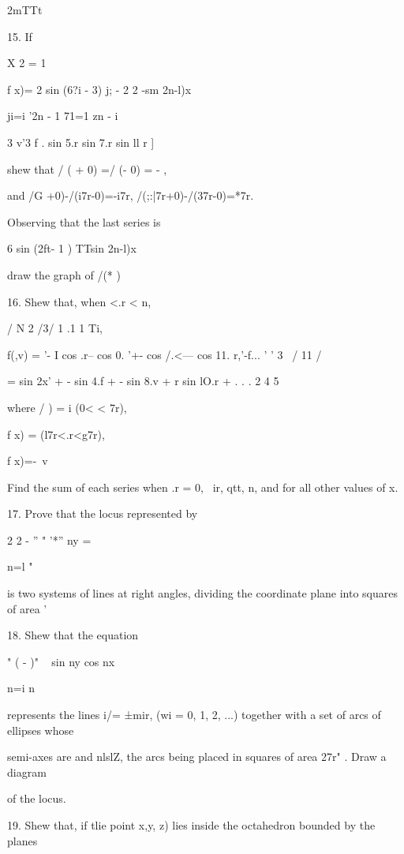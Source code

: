 2mTTt


%
%

15. If

X 2 = 1

f x)= 2 sin (6?i - 3) j; - 2 2 -sm 2n-l)x

ji=i '2n - 1 71=1 zn - i

3 v'3 f . sin 5.r sin 7.r sin ll r ]

shew that / ( + 0) =/ (\pi - 0) = - \pi,

and /G +0)-/(i7r-0)=-i7r, /(;:|7r+0)-/(37r-0)=*7r.

Observing that the last series is

6 sin (2ft- 1 ) TTsin 2n-l)x

draw the graph of /(* ) 

16. Shew that, when <.r < n,

 / N 2 /3/ 1 .1 1 Ti, \

f(,v) = '- I cos .r-- cos 0. '+- cos /.<--- cos 11. r,'-f... ' ' 3 \
/ 11 /

= sin 2x' + - sin 4.f + - sin 8.v + r sin lO.r + . . . 2 4 5

where / ) = i (0< < 7r),

f x) = (l7r<.r<g7r),

f x)=-\ v %

Find the sum of each series when .r = 0, \ ir, qtt, n, and for all
other values of x.


17. Prove that the locus represented by

2 2 - '' " '*'' ny =

n=l "

is two systems of lines at right angles, dividing the coordinate plane
into squares of area \pi'\ \addexamplecitation{Math. Trip. 1895.}

18. Shew that the equation

" ( - )" ~ sin ny cos nx \

n=i n ~

represents the lines i/= ±mir, (wi = 0, 1, 2, ...) together with a set
of arcs of ellipses whose

semi-axes are \pi and nlslZ, the arcs being placed in squares of area
27r" . Draw a diagram

of the locus. 

19. Shew that, if tlie point x,y, z) lies inside the octahedron
bounded by the planes

